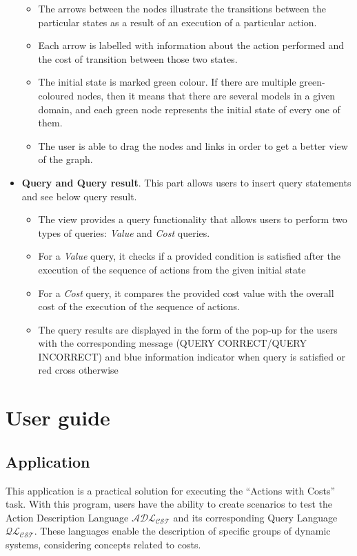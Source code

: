 \documentclass[a4paper]{article}
\begin{document}
\begin{itemize}
\begin{itemize}
        \item The arrows between the nodes illustrate the transitions between the particular states as a result of an execution of a particular action.
        \item Each arrow is labelled with information about the action performed and the cost of transition between those two states.
        \item The initial state is marked green colour. If there are multiple green-coloured nodes, then it means that there are several models in a given domain, and each green node represents the initial state of every one of them.
        \item The user is able to drag the nodes and links in order to get a better view of the graph.
    \end{itemize}
    \item \textbf{Query and Query result}. This part allows users to insert query statements and see below query result.
    \begin{itemize}
        \item The view provides a query functionality that allows users to perform two types of queries: \emph{Value} and \emph{Cost} queries.
        \item For a \emph{Value} query, it checks if a provided condition is satisfied after the execution of the sequence of actions from the given initial state
        \item For a \emph{Cost} query, it compares the provided cost value with the overall cost of the execution of the sequence of actions. 
        \item The query results are displayed in the form of the pop-up for the users with the corresponding message (QUERY CORRECT/QUERY INCORRECT) and blue information indicator when query is satisfied or red cross otherwise
   \end{itemize}
\end{itemize}

\section{User guide}
\subsection{Application}
%
This application is a practical solution for executing the ``Actions with Costs'' task. With this program, users have the ability to create scenarios to test the Action Description Language $\mathcal{ADL_{CST}}$ and its corresponding Query Language $\mathcal{QL_{CST}}$. These languages enable the description of specific groups of dynamic systems, considering concepts related to costs.
\end{document}
